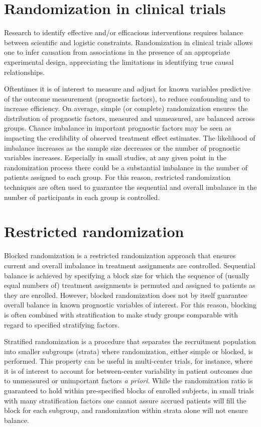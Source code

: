 \section[Randomization in RCTs]{Randomization in clinical trials}
Research to identify effective and/or efficacious interventions requires balance between scientific and logistic constraints. 
Randomization in clinical trials allows one to infer causation from associations in the presence of an appropriate experimental design, appreciating the limitations in identifying true causal relationships. 

Oftentimes it is of interest to measure and adjust for known variables predictive of the outcome measurement (prognostic factors), to reduce confounding and to increase efficiency.  
On average, simple (or complete) randomization ensures the distribution of prognostic factors, measured and unmeasured, are balanced across groups.  
Chance imbalance in important prognostic factors may be seen as impacting the credibility of observed treatment effect estimates.  
The likelihood of imbalance increases as the sample size decreases or the number of prognostic variables increases.  
Especially in small studies, at any given point in the randomization process there could be a substantial imbalance in the number of patients assigned to each group.  
For this reason, restricted randomization techniques are often used to guarantee the sequential and overall imbalance in the number of participants in each group is controlled.


\section{Restricted randomization}
Blocked randomization is a restricted randomization approach that ensures current and overall imbalance in treatment assignments are controlled.  
Sequential balance is achieved by specifying a block size for which the sequence of (usually equal numbers of) treatment assignments is permuted and assigned to patients as they are enrolled. 
However, blocked randomization does not by itself guarantee overall balance in known prognostic variables of interest.  
For this reason, blocking is often combined with stratification to make study groups comparable with regard to specified stratifying factors.  

Stratified randomization is a procedure that separates the recruitment population into smaller subgroups (strata) where randomization, either simple or blocked, is performed.  
This property can be useful in multi-center trials, for instance, where it is of interest to account for between-center variability in patient outcomes due to unmeasured or unimportant factors \textit{a priori}. 
While the randomization ratio is guaranteed to hold within pre-specified blocks of enrolled subjects, in small trials with many stratification factors one cannot assure accrued patients will fill the block for each subgroup, and randomization within strata alone will not ensure balance.  

